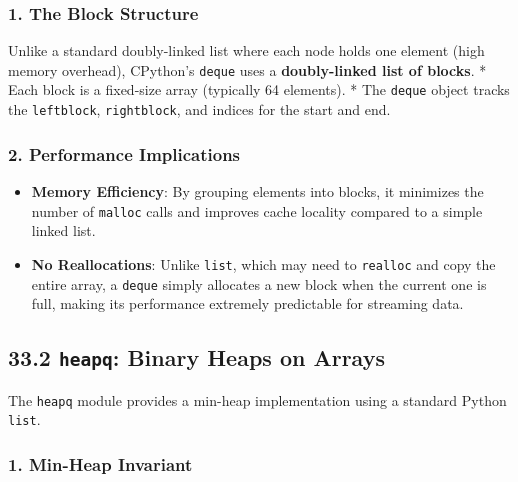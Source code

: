 \hypertarget{the-block-structure}{%
\subsubsection{1. The Block Structure}\label{the-block-structure}}

Unlike a standard doubly-linked list where each node holds one element
(high memory overhead), CPython's \passthrough{\lstinline!deque!} uses a
\textbf{doubly-linked list of blocks}. * Each block is a fixed-size
array (typically 64 elements). * The \passthrough{\lstinline!deque!}
object tracks the \passthrough{\lstinline!leftblock!},
\passthrough{\lstinline!rightblock!}, and indices for the start and end.

\hypertarget{performance-implications}{%
\subsubsection{2. Performance
Implications}\label{performance-implications}}

\begin{itemize}
\tightlist
\item
  \textbf{Memory Efficiency}: By grouping elements into blocks, it
  minimizes the number of \passthrough{\lstinline!malloc!} calls and
  improves cache locality compared to a simple linked list.
\item
  \textbf{No Reallocations}: Unlike \passthrough{\lstinline!list!},
  which may need to \passthrough{\lstinline!realloc!} and copy the
  entire array, a \passthrough{\lstinline!deque!} simply allocates a new
  block when the current one is full, making its performance extremely
  predictable for streaming data.
\end{itemize}

\hypertarget{heapq-binary-heaps-on-arrays}{%
\subsection{\texorpdfstring{33.2 \texttt{heapq}: Binary Heaps on
Arrays}{33.2 heapq: Binary Heaps on Arrays}}\label{heapq-binary-heaps-on-arrays}}

The \passthrough{\lstinline!heapq!} module provides a min-heap
implementation using a standard Python \passthrough{\lstinline!list!}.

\hypertarget{min-heap-invariant}{%
\subsubsection{1. Min-Heap Invariant}\label{min-heap-invariant}}

